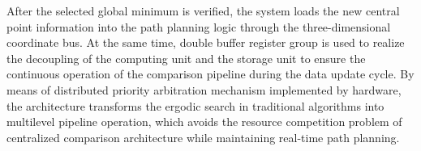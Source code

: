 After the selected global minimum is verified, the system loads the new central point information into the path planning logic through the three-dimensional coordinate bus. At the same time, double buffer register group is used to realize the decoupling of the computing unit and the storage unit to ensure the continuous operation of the comparison pipeline during the data update cycle.
By means of distributed priority arbitration mechanism implemented by hardware, the architecture transforms the ergodic search in traditional algorithms into multilevel pipeline operation, which avoids the resource competition problem of centralized comparison architecture while maintaining real-time path planning.





